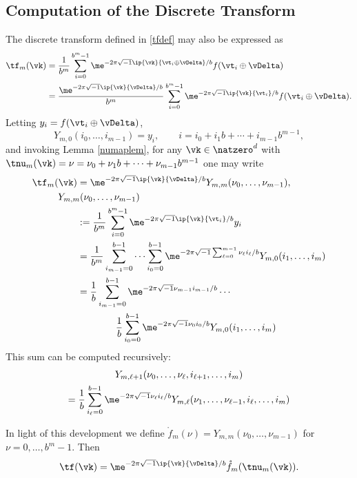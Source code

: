 \documentclass[]{elsarticle}
\theoremstyle{definition}
\renewcommand{\bbK}{\natzero^d}
\begin{document}
\subsection{Computation of the Discrete Transform}
The discrete transform defined in \eqref{tfdef} may also be expressed as
\begin{align}
\nonumber
\tf_m(\vk) 
&= \frac{1}{b^m} \sum_{i=0}^{b^m-1} \me^{-2 \pi \sqrt{-1} \ip{\vk}{\vt_i\oplus \vDelta}/b} f(\vt_i\oplus \vDelta) \\
\nonumber
&= \frac{\me^{-2 \pi \sqrt{-1} \ip{\vk}{\vDelta}/b}}{b^m} \sum_{i=0}^{b^m-1} \me^{-2 \pi \sqrt{-1} \ip{\vk}{\vt_i}/b} f(\vt_i\oplus \vDelta).
\end{align}
Letting $y_i=f(\vt_i\oplus \vDelta)$, 
\[
Y_{m,0}(i_0,\ldots, i_{m-1}) = y_i, \qquad i=i_0 + i_1 b + \cdots + i_{m-1} b^{m-1},
\]
and invoking Lemma \ref{numaplem}, for any $\vk \in \bbK$ with $\tnu_m(\vk)=\nu = \nu_0 + \nu_1 b  + \cdots + \nu_{m-1} b^{m-1}$ one may write
\begin{align}
\nonumber
\tf_m(\vk) &= \me^{-2 \pi \sqrt{-1} \ip{\vk}{\vDelta}/b}  Y_{m,m}(\nu_0, \ldots, \nu_{m-1}) , \\
\nonumber
\MoveEqLeft{Y_{m,m}(\nu_0, \ldots, \nu_{m-1})}\\ 
\nonumber
& : = \frac{1}{b^m} \sum_{i=0}^{b^m-1} \me^{-2 \pi \sqrt{-1} \ip{\vk}{\vt_i}/b} y_i \\
\nonumber
& = \frac{1}{b^m} \sum_{i_{m-1}=0}^{b-1} \cdots \sum_{i_0=0}^{b-1} \me^{-2 \pi \sqrt{-1} \sum_{\ell=0}^{m-1} \nu_\ell i_\ell/b} Y_{m,0}(i_1,\ldots, i_m) \\
\nonumber
& = \frac{1}{b} \sum_{i_{m-1}=0}^{b-1}\me^{-2 \pi \sqrt{-1} \nu_{m-1} i_{m-1}/b}  \cdots \\
&\qquad \qquad \frac{1}{b} \sum_{i_0=0}^{b-1} \me^{-2 \pi \sqrt{-1} \nu_0 i_0/b} Y_{m,0}(i_1,\ldots, i_m)
\nonumber
\end{align}
This sum can be computed recursively:
\begin{multline*}
Y_{m,\ell+1}(\nu_0, \ldots, \nu_{\ell},i_{\ell+1}, \ldots, i_m) \\
= \frac{1}{b} \sum_{i_\ell=0}^{b-1} \me^{-2 \pi \sqrt{-1} \nu_\ell i_\ell/b } Y_{m,\ell}(\nu_1, \ldots, \nu_{\ell-1},i_{\ell}, \ldots, i_m)
\end{multline*}

In light of this development we define $\mathring{f}_m(\nu)=Y_{m,m}(\nu_0, \ldots, \nu_{m-1})$ for $\nu=0, \ldots, b^{m}-1$. Then 
\[
\tf(\vk) = \me^{-2 \pi \sqrt{-1} \ip{\vk}{\vDelta}/b} \mathring{f}_m(\tnu_m(\vk)).
\]
\end{document}
